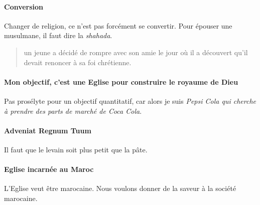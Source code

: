 \paragraph{Conversion} Changer de religion, ce n'est pas forcément se convertir. Pour épouser une musulmane, il faut dire la \textit{shahada}. 
\begin{quote}
    un jeune a décidé de rompre avec son amie le jour où il a découvert qu'il devait renoncer à sa foi chrétienne.
\end{quote}


\paragraph{Mon objectif, c'est une Eglise pour construire le royaume de Dieu} Pas prosélyte pour un objectif quantitatif, car alors je suis \textit{Pepsi Cola qui cherche à prendre des parts de marché de Coca Cola}.

\paragraph{Adveniat Regnum Tuum} Il faut que le levain soit plus petit que la pâte. 

\paragraph{Eglise incarnée au Maroc} L'Eglise veut être marocaine. Nous voulons donner de la saveur à la société marocaine. 

